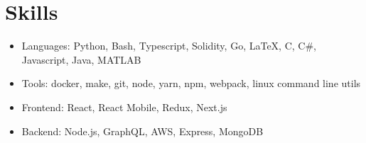 \documentclass{article}
\begin{document}
	\section{Skills}
	\vspace{3pt}
	\begin{itemize}
    \item Languages: Python, Bash, Typescript, Solidity, Go, {\latexfont \LaTeX}, C, C\#, Javascript, Java, MATLAB
		\item Tools: docker, make, git, node, yarn, npm, webpack, linux command line utils
		\item Frontend: React, React Mobile, Redux, Next.js
		\item Backend: Node.js, GraphQL, AWS, Express, MongoDB
	\end{itemize}
\end{document}
